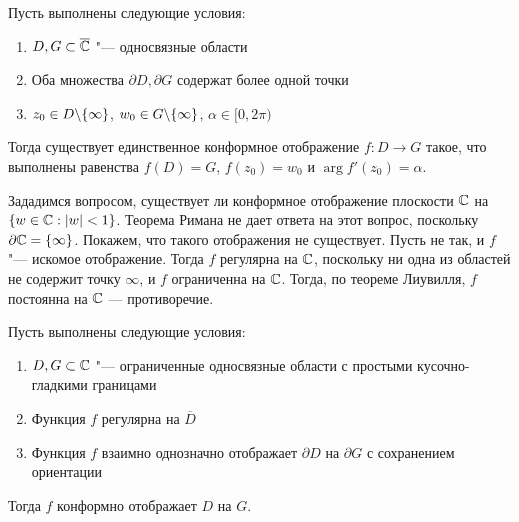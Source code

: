 \begin{theorem}
	Пусть выполнены следующие условия:
	\begin{enumerate}
		\item $D, G \subset \overline{\mathbb{C}}$ "--- односвязные области
		\item Оба множества $\partial D, \partial G$ содержат более одной точки
		\item $z_0 \in D \backslash \{\infty\}$, $w_0 \in G \backslash \{\infty\}$, $\alpha \in [0, 2\pi)$
	\end{enumerate}
	
	Тогда существует единственное конформное отображение $f : D \to G$ такое, что выполнены равенства $f(D) = G$, $f(z_0) = w_0$ и $\arg f'(z_0) = \alpha$.
\end{theorem}

\begin{example}
	Зададимся вопросом, существует ли конформное отображение плоскости $\mathbb{C}$ на $\{w \in \mathbb{C}: |w| < 1\}$. Теорема Римана не дает ответа на этот вопрос, поскольку $\partial \mathbb{C} = \{\infty\}$. Покажем, что такого отображения не существует. Пусть не так, и $f$ "--- искомое отображение. Тогда $f$ регулярна на $\mathbb{C}$, поскольку ни одна из областей не содержит точку $\infty$, и $f$ ограниченна на $\mathbb{C}$. Тогда, по теореме Лиувилля, $f$ постоянна на $\mathbb{C}$ --- противоречие.
\end{example}

\begin{theorem}
	Пусть выполнены следующие условия:
	\begin{enumerate}
		\item $D, G \subset \mathbb{C}$ "--- ограниченные односвязные области с простыми кусочно-гладкими границами
		\item Функция $f$ регулярна на $\overline{D}$
		\item Функция $f$ взаимно однозначно отображает $\partial D$ на $\partial G$ с сохранением ориентации
	\end{enumerate}
	
	Тогда $f$ конформно отображает $D$ на $G$.
\end{theorem}

